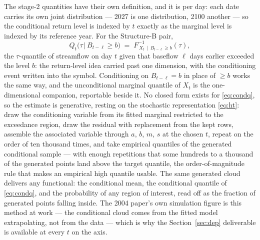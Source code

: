 \documentclass[11pt]{article}
\begin{document}
The stage-2 quantities have their own definition, and it is per day: each date carries its own joint distribution --- 2027 is one distribution, 2100 another --- so the conditional return level is indexed by $t$ exactly as the marginal level is indexed by its reference year. For the Structure-B pair,
\begin{equation}\label{eq:condq}
Q_t\bigl(\tau \,\big|\, B_{t-\ell} \ge b\bigr) \;=\; F^{-1}_{\,X_t \,\mid\, B_{t-\ell} \ge b}(\tau),
\end{equation}
the $\tau$-quantile of streamflow on day $t$ given that baseflow $\ell$ days earlier exceeded the level $b$: the return-level idea carried past one dimension, with the conditioning event written into the symbol. Conditioning on $B_{t-\ell} = b$ in place of $\ge b$ works the same way, and the unconditional marginal quantile of $X_t$ is the one-dimensional companion, reportable beside it. No closed form exists for \eqref{eq:condq}, so the estimate is generative, resting on the stochastic representation \eqref{eq:ht}: draw the conditioning variable from its fitted marginal restricted to the exceedance region, draw the residual with replacement from the kept rows, assemble the associated variable through $a$, $b$, $m$, $s$ at the chosen $t$, repeat on the order of ten thousand times, and take empirical quantiles of the generated conditional sample --- with enough repetitions that some hundreds to a thousand of the generated points land above the target quantile, the order-of-magnitude rule that makes an empirical high quantile usable. The same generated cloud delivers any functional: the conditional mean, the conditional quantile of \eqref{eq:condq}, and the probability of any region of interest, read off as the fraction of generated points falling inside. The 2004 paper's own simulation figure is this method at work --- the conditional cloud comes from the fitted model extrapolating, not from the data --- which is why the Section~\ref{sec:dep} deliverable is available at every $t$ on the axis.
\end{document}
